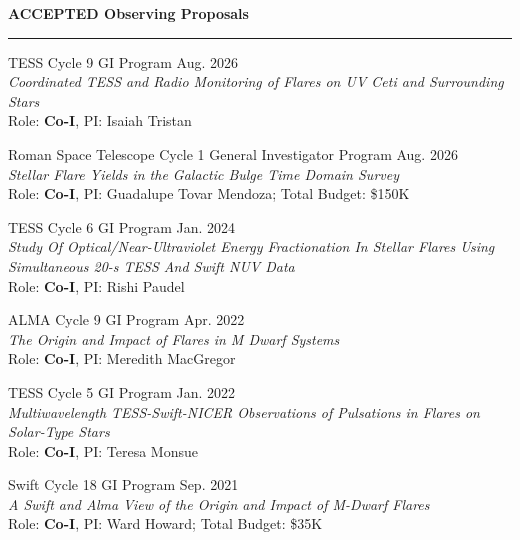 \documentclass[12pt]{article}
\begin{document}
\noindent
{\bf ACCEPTED Observing Proposals} \\
\vspace{-10mm}
\begin{center}
\rule{\textwidth}{0.2mm}
\end{center}
\vspace{-3mm}
\noindent
\begin{etaremune}
\renewcommand\labelenumi{\bfseries\theenumi .}

\item TESS Cycle 9 GI Program \hfill Aug. 2026 \\
\textit{Coordinated TESS and Radio Monitoring of Flares on UV Ceti and Surrounding Stars} \\
Role: \textbf{Co-I}, PI: Isaiah Tristan

\item Roman Space Telescope Cycle 1 General Investigator Program \hfill Aug. 2026 \\
\textit{Stellar Flare Yields in the Galactic Bulge Time Domain Survey} \\
Role: \textbf{Co-I}, PI: Guadalupe Tovar Mendoza; Total Budget: \$150K

\item TESS Cycle 6 GI Program \hfill Jan. 2024 \\
\textit{Study Of Optical/Near-Ultraviolet Energy Fractionation In Stellar Flares Using Simultaneous 20-s TESS And Swift NUV Data} \\ Role: \textbf{Co-I}, PI: Rishi Paudel

\item ALMA Cycle 9 GI Program \hfill Apr. 2022 \\
\textit{The Origin and Impact of Flares in M Dwarf Systems} \\ Role: \textbf{Co-I}, PI: Meredith MacGregor

\item TESS Cycle 5 GI Program \hfill Jan. 2022 \\
\textit{Multiwavelength TESS-Swift-NICER Observations of Pulsations in Flares on Solar-Type Stars} \\ Role: \textbf{Co-I}, PI: Teresa Monsue

\item Swift Cycle 18 GI Program \hfill Sep. 2021 \\
\textit{A Swift and Alma View of the Origin and Impact of M-Dwarf Flares} \\ Role: \textbf{Co-I}, PI: Ward Howard; Total Budget: \$35K


\end{etaremune}
\end{document}
